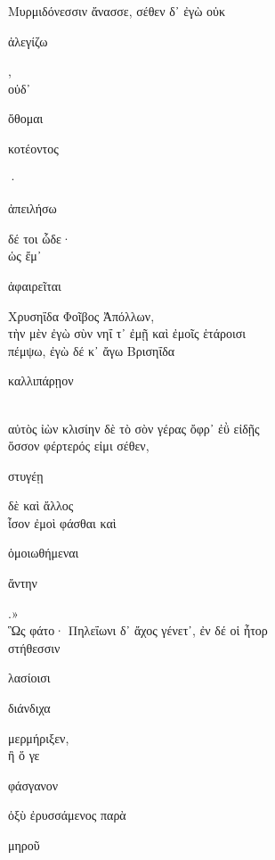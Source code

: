 \documentclass{ransom}
\begin{document}
\renewcommand{\rightheaderwhat}{\rightheaderwhatglosses}%
\begin{foreignpage}
\begin{graytext}
Μυρμιδόνεσσιν ἄνασσε, σέθεν δ᾽ ἐγὼ οὐκ \begin{whitetext}ἀλεγίζω\end{whitetext},\hfill{}\\
οὐδ᾽ \begin{whitetext}ὄθομαι\end{whitetext} \begin{whitetext}κοτέοντος\end{whitetext}· \begin{whitetext}ἀπειλήσω\end{whitetext} δέ τοι ὧδε·\\
ὡς ἔμ᾽ \begin{whitetext}ἀφαιρεῖται\end{whitetext} Χρυσηΐδα Φοῖβος Ἀπόλλων,\\
τὴν μὲν ἐγὼ σὺν νηΐ τ᾽ ἐμῇ καὶ ἐμοῖς ἑτάροισι\\
πέμψω, ἐγὼ δέ κ᾽ ἄγω Βρισηΐδα \begin{whitetext}καλλιπάρῃον\end{whitetext}\\
αὐτὸς ἰὼν κλισίην δὲ τὸ σὸν γέρας ὄφρ᾽ ἐῢ εἰδῇς\hfill{}\\
ὅσσον φέρτερός εἰμι σέθεν, \begin{whitetext}στυγέῃ\end{whitetext} δὲ καὶ ἄλλος\\
ἶσον ἐμοὶ φάσθαι καὶ \begin{whitetext}ὁμοιωθήμεναι\end{whitetext} \begin{whitetext}ἄντην\end{whitetext}.»\\
Ὣς φάτο· Πηλεΐωνι δ᾽ ἄχος γένετ᾽, ἐν δέ οἱ ἦτορ\\
στήθεσσιν \begin{whitetext}λασίοισι\end{whitetext} \begin{whitetext}διάνδιχα\end{whitetext} μερμήριξεν,\\
ἢ ὅ γε \begin{whitetext}φάσγανον\end{whitetext} ὀξὺ ἐρυσσάμενος παρὰ \begin{whitetext}μηροῦ\end{whitetext}\hfill{}\\

\end{graytext}
\end{foreignpage}
\end{document}
